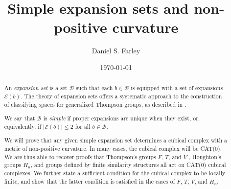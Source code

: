\documentclass{amsart}
\title[Simple expansion sets and non-positive curvature]{Simple expansion sets and non-positive curvature}
\author[D.~S.~Farley]{Daniel S. Farley}
\date{\today}
\newtheorem{standing assumption}[theorem]{Standing Assumption}
\begin{document}
\begin{abstract}
An \emph{expansion set} is a set $\mathcal{B}$ such that each
$b \in \mathcal{B}$ is equipped with a set of expansions $\mathcal{E}(b)$. 
The theory of expansion sets offers a systematic approach to the construction of classifying spaces for generalized Thompson groups, as described in \cite{Farley}.

We say that $\mathcal{B}$ 
is \emph{simple} if proper expansions are unique when they exist, or, equivalently, if $|\mathcal{E}(b)| \leq 2$ for all $b \in \mathcal{B}$. 

We will prove that any given simple expansion set determines a cubical complex with a metric of non-positive curvature. In many cases, the cubical complex will be CAT(0). 
We are thus able to recover proofs that Thompson's groups $F$, $T$, and $V$  \cite{MyThesis, Morethesis}, Houghton's groups $H_{n}$, and groups defined by finite similarity structures \cite{Hughes, FH1, FH2} all act on CAT(0) cubical complexes. We further state a sufficient condition for the cubical complex to be locally finite, and show that the latter condition is satisfied in the cases of $F$, $T$, $V$, and $H_{n}$.
\end{abstract}



\maketitle

\setcounter{tocdepth}{2} \tableofcontents

\end{document}

